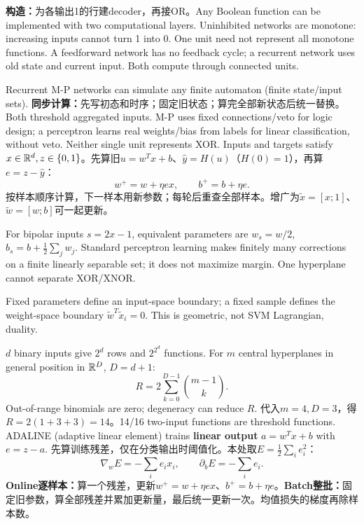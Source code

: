 
\textbf{构造：}为各输出1的行建decoder，再接OR。Any Boolean function can be implemented with two computational layers. Uninhibited networks are monotone: increasing inputs cannot turn 1 into 0. One unit need not represent all monotone functions.
A feedforward network has no feedback cycle; a recurrent network uses old state and current input. Both compute through connected units.

Recurrent M-P networks can simulate any finite automaton (finite state/input sets). \textbf{同步计算：}先写初态和时序；固定旧状态；算完全部新状态后统一替换。
Both threshold aggregated inputs. M-P uses fixed connections/veto for logic design; a perceptron learns real weights/bias from labels for linear classification, without veto. Neither single unit represents XOR.
Inputs and targets satisfy $x\in\mathbb{R}^d,z\in\{0,1\}$。先算旧$u=w^Tx+b$、$\hat y=H(u)$（$H(0)=1$），再算$e=z-\hat y$：
\[w^+=w+\eta ex,\qquad b^+=b+\eta e.\]
按样本顺序计算，下一样本用新参数；每轮后重查全部样本。增广为$\tilde x=[x;1]$、$\tilde w=[w;b]$可一起更新。

For bipolar inputs $s=2x-1$, equivalent parameters are $w_s=w/2$, $b_s=b+\frac12\sum_jw_j$.
Standard perceptron learning makes finitely many corrections on a finite linearly separable set; it does not maximize margin. One hyperplane cannot separate XOR/XNOR.

Fixed parameters define an input-space boundary; a fixed sample defines the weight-space boundary $\tilde w^T\tilde x_i=0$. This is geometric, not SVM Lagrangian, duality.

$d$ binary inputs give $2^d$ rows and $2^{2^d}$ functions. For $m$ central hyperplanes in general position in $\mathbb{R}^D$, $D=d+1$:
\[R=2\sum_{k=0}^{D-1}\binom{m-1}{k}.\]
Out-of-range binomials are zero; degeneracy can reduce $R$. 代入$m=4,D=3$，得$R=2(1+3+3)=14$。14/16 two-input functions are threshold functions.
\columnend\sepcol
\columnstart
{}
ADALINE (adaptive linear element) trains \textbf{linear output} $a=w^Tx+b$ with $e=z-a$. 先算训练残差，仅在分类输出时阈值化。本处取$E=\tfrac12\sum_i e_i^2$：
\[\nabla_wE=-\sum_i e_ix_i,\qquad \partial_b E=-\sum_i e_i.\]
\textbf{Online逐样本：}算一个残差，更新$w^+=w+\eta ex$、$b^+=b+\eta e$。\textbf{Batch整批：}固定旧参数，算全部残差并累加更新量，最后统一更新一次。均值损失的梯度再除样本数。

